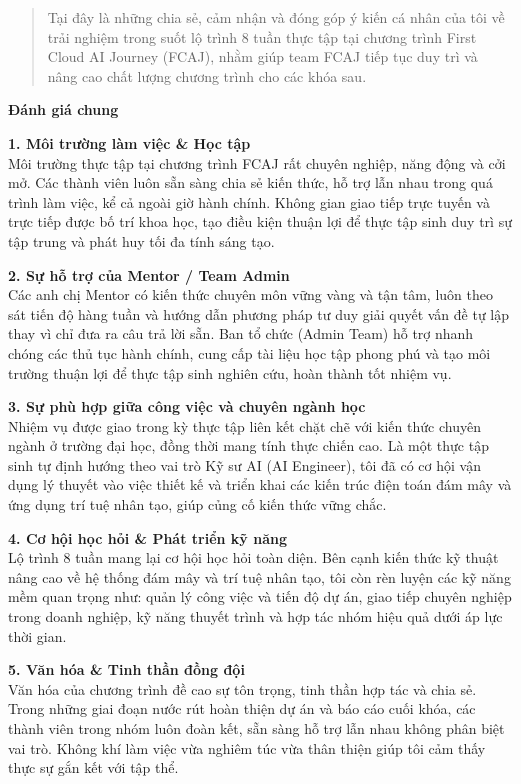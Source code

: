 \begin{quote}
Tại đây là những chia sẻ, cảm nhận và đóng góp ý kiến cá nhân của tôi về
trải nghiệm trong suốt lộ trình 8 tuần thực tập tại chương trình First
Cloud AI Journey (FCAJ), nhằm giúp team FCAJ tiếp tục duy trì và nâng
cao chất lượng chương trình cho các khóa sau.
\end{quote}

\vspace{0.5em}\noindent\textbf{Đánh giá chung}

\textbf{1. Môi trường làm việc \& Học tập}\\
Môi trường thực tập tại chương trình FCAJ rất chuyên nghiệp, năng động
và cởi mở. Các thành viên luôn sẵn sàng chia sẻ kiến thức, hỗ trợ lẫn
nhau trong quá trình làm việc, kể cả ngoài giờ hành chính. Không gian
giao tiếp trực tuyến và trực tiếp được bố trí khoa học, tạo điều kiện
thuận lợi để thực tập sinh duy trì sự tập trung và phát huy tối đa tính
sáng tạo.

\textbf{2. Sự hỗ trợ của Mentor / Team Admin}\\
Các anh chị Mentor có kiến thức chuyên môn vững vàng và tận tâm, luôn
theo sát tiến độ hàng tuần và hướng dẫn phương pháp tư duy giải quyết
vấn đề tự lập thay vì chỉ đưa ra câu trả lời sẵn. Ban tổ chức (Admin
Team) hỗ trợ nhanh chóng các thủ tục hành chính, cung cấp tài liệu học
tập phong phú và tạo môi trường thuận lợi để thực tập sinh nghiên cứu,
hoàn thành tốt nhiệm vụ.

\textbf{3. Sự phù hợp giữa công việc và chuyên ngành học}\\
Nhiệm vụ được giao trong kỳ thực tập liên kết chặt chẽ với kiến thức
chuyên ngành ở trường đại học, đồng thời mang tính thực chiến cao. Là
một thực tập sinh tự định hướng theo vai trò Kỹ sư AI (AI Engineer), tôi
đã có cơ hội vận dụng lý thuyết vào việc thiết kế và triển khai các kiến
trúc điện toán đám mây và ứng dụng trí tuệ nhân tạo, giúp củng cố kiến
thức vững chắc.

\textbf{4. Cơ hội học hỏi \& Phát triển kỹ năng}\\
Lộ trình 8 tuần mang lại cơ hội học hỏi toàn diện. Bên cạnh kiến thức kỹ
thuật nâng cao về hệ thống đám mây và trí tuệ nhân tạo, tôi còn rèn
luyện các kỹ năng mềm quan trọng như: quản lý công việc và tiến độ dự
án, giao tiếp chuyên nghiệp trong doanh nghiệp, kỹ năng thuyết trình và
hợp tác nhóm hiệu quả dưới áp lực thời gian.

\textbf{5. Văn hóa \& Tinh thần đồng đội}\\
Văn hóa của chương trình đề cao sự tôn trọng, tinh thần hợp tác và chia
sẻ. Trong những giai đoạn nước rút hoàn thiện dự án và báo cáo cuối
khóa, các thành viên trong nhóm luôn đoàn kết, sẵn sàng hỗ trợ lẫn nhau
không phân biệt vai trò. Không khí làm việc vừa nghiêm túc vừa thân
thiện giúp tôi cảm thấy thực sự gắn kết với tập thể.

